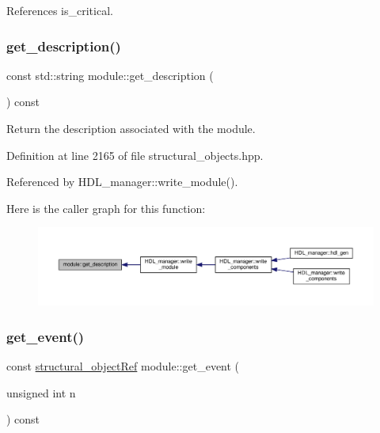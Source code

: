 References is\+\_\+critical.

\mbox{\label{classmodule_a797cee4c5f6d982abbdd94abc477627f}} 
\subsubsection{\texorpdfstring{get\+\_\+description()}{get\_description()}}
{\footnotesize\ttfamily const std\+::string module\+::get\+\_\+description (\begin{DoxyParamCaption}{ }\end{DoxyParamCaption}) const\hspace{0.3cm}{\ttfamily [inline]}}



Return the description associated with the module. 



Definition at line 2165 of file structural\+\_\+objects.\+hpp.



Referenced by H\+D\+L\+\_\+manager\+::write\+\_\+module().

Here is the caller graph for this function\+:
\nopagebreak
\begin{figure}[H]
\begin{center}
\leavevmode
\includegraphics[width=350pt]{d0/dd3/classmodule_a797cee4c5f6d982abbdd94abc477627f_icgraph}
\end{center}
\end{figure}
\mbox{\label{classmodule_a386874df14ff004219fde77c17010aa2}} 
\subsubsection{\texorpdfstring{get\+\_\+event()}{get\_event()}}
{\footnotesize\ttfamily const \hyperlink{structural__objects_8hpp_a8ea5f8cc50ab8f4c31e2751074ff60b2}{structural\+\_\+object\+Ref} module\+::get\+\_\+event (\begin{DoxyParamCaption}\item[{unsigned int}]{n }\end{DoxyParamCaption}) const}



